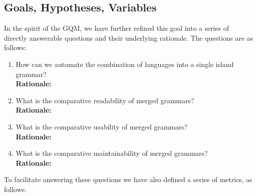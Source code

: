 \documentclass[10pt,nocc]{xrese_report}
\begin{document}
\subsection{Goals, Hypotheses, Variables}

In the spirit of the GQM, we have further refined this goal into a series of directly answerable questions and their underlying rationale. The questions are as follows:

\begin{enumerate}[left=1em,label=\bfseries RQ\arabic*:]
  \item How can we automate the combination of languages into a single island grammar?\\
  \textbf{Rationale:}
  \item What is the comparative readability of merged grammars?\\
  \textbf{Rationale:}
  \item What is the comparative usability of merged grammars?\\
  \textbf{Rationale:}
  \item What is the comparative maintainability of merged grammars?\\
  \textbf{Rationale:}
\end{enumerate}

To facilitate answering these questions we have also defined a series of metrics, as follows:
\end{document}
